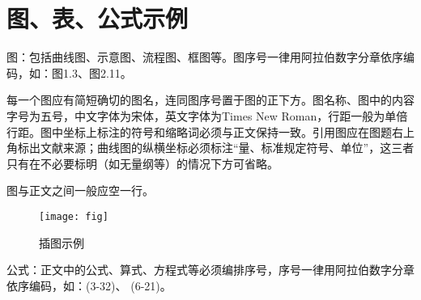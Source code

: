 \chapter{图、表、公式示例}
图：包括曲线图、示意图、流程图、框图等。图序号一律用阿拉伯数字分章依序编码，如：图1.3、图2.11。
\par
每一个图应有简短确切的图名，连同图序号置于图的正下方。图名称、图中的内容字号为五号，中文字体为宋体，英文字体为Times New Roman，行距一般为单倍行距。图中坐标上标注的符号和缩略词必须与正文保持一致。引用图应在图题右上角标出文献来源；曲线图的纵横坐标必须标注“量、标准规定符号、单位”，这三者只有在不必要标明（如无量纲等）的情况下方可省略。
\par
图与正文之间一般应空一行。
\begin{figure}
\centering
\texttt{[image: fig]}\\
\caption{插图示例}
\end{figure}
\par
公式：正文中的公式、算式、方程式等必须编排序号，序号一律用阿拉伯数字分章依序编码，如：(3-32)、 (6-21)。
\par

